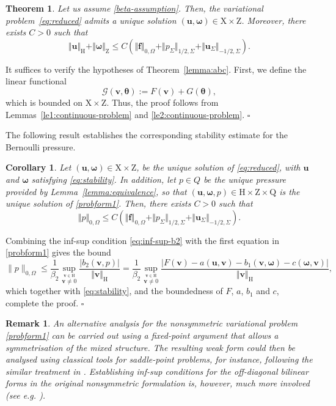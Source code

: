 \documentclass[reqno,a4paper]{article}
\numberwithin{equation}{section}
\newcommand\ff{\boldsymbol{f}}
\newcommand\bu{\boldsymbol{u}}
\newcommand\bv{\boldsymbol{v}}
\renewcommand\O{\Omega}
\renewcommand\H{\mathrm{H}}
\newcommand\Q{\mathrm{Q}}
\newcommand\Z{\mathrm{Z}}
\newcommand\X{\mathrm{X}}
\newcommand\bomega{\boldsymbol{\omega}}
\newcommand\btheta{\boldsymbol{\theta}}
\newtheorem{remark}{Remark}[section]
\newtheorem{theorem}{Theorem}[section]
\newtheorem{corollary}{Corollary}
\newenvironment{proof}{\noindent{\it Proof.}}{\hfill$\square$}
\begin{document}
\begin{theorem}\label{th:continuous-problem}
Let us assume \eqref{beta-assumption}. 
Then, the variational problem~\eqref{eq:reduced} admits a unique solution
$(\bu,\bomega)\in\X\times\Z$. Moreover, there
exists $C>0$ such that
\begin{equation}\label{eq:stability}
\Vert\bu\Vert_{\H}+\Vert\bomega\Vert_{\Z}\le
C(\Vert\ff\Vert_{0,\O}+\Vert p_{\Sigma}\Vert_{1/2,\Sigma}+\Vert 
\bu_{\Sigma}\Vert_{-1/2,\Sigma}).
\end{equation}
\end{theorem}
\begin{proof}
It suffices to verify the hypotheses of Theorem~\ref{lemma:abc}.
First, we define the linear functional
$$\mathcal G(\bv,\btheta):=F(\bv)+G(\btheta),$$
which is bounded on $\X\times\Z$.
Thus, the proof follows from Lemmas~\ref{le1:continuous-problem} and \ref{le2:continuous-problem}.
\end{proof}

The following result establishes the corresponding stability estimate for the Bernoulli pressure.
\begin{corollary}\label{coro1}
Let $(\bu,\bomega)\in \X\times \Z$, be the unique solution of \eqref{eq:reduced},
with $\bu$ and $\bomega$ satisfying \eqref{eq:stability}. 
In addition, let $p\in Q$ be the unique pressure provided
by Lemma~\ref{lemma:equivalence}, so that $(\bu,\bomega,p)\in \H\times \Z\times \Q$
is the unique solution of \eqref{probform1}.
Then, there exists $C>0$ such that
\begin{equation*}
\Vert p\Vert_{0,\O}\le
C(\Vert\ff\Vert_{0,\O}+\Vert p_{\Sigma}\Vert_{1/2,\Sigma}+\Vert 
\bu_{\Sigma}\Vert_{-1/2,\Sigma}).
\end{equation*}
\end{corollary}
\begin{proof}
Combining the inf-sup condition \eqref{eq:inf-sup-b2}
with the first equation in \eqref{probform1} gives the bound 
$$
\|p\|_{0,\Omega}\le \frac{1}{\beta_2}\sup_{\stackrel{\scriptstyle\bv\in\H}{\bv\ne0}}\frac{\vert
b_{2}(\bv,p)\vert}{\Vert\bv\Vert_{\H}}=\frac{1}{\beta_2}\sup_{\stackrel{
\scriptstyle\bv\in\H}{\bv\ne0}}\frac{\vert
F(\bv)-a(\bu,\bv)-b_1(\bv,\bomega)-c(\bomega,\bv)\vert}{\Vert\bv\Vert_
{ \H } } ,
$$
which together with \eqref{eq:stability}, and the boundedness
of $F$, $a$, $b_1$ and $c$, complete the proof.
\end{proof}

\begin{remark}
An alternative analysis for the nonsymmetric variational problem \eqref{probform1} can be 
carried out using a fixed-point  argument that allows a symmetrisation of the mixed structure. 
 The resulting weak form could then be analysed using classical tools for saddle-point problems, 
 for instance, following the similar treatment in \cite{caucao16}. Establishing inf-sup conditions for the 
off-diagonal bilinear forms in the original nonsymmetric formulation is, however, much more involved 
(see e.g. \cite{nicolaides82}). \end{remark}
\end{document}
